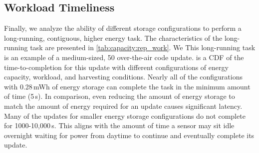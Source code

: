 \subsection{Workload Timeliness}
Finally, we analyze the ability of different storage configurations to perform a 
long-running, contiguous, higher energy task. 
The characteristics of the long-running task are presented in \cref{tab:capacity:rep_work}. We 
This long-running task is an example of a medium-sized, 50\ssi{\kilo\byte} over-the-air code update.
 is a CDF of the time-to-completion for this update with different configurations of energy capacity, workload, and harvesting conditions.
Nearly all of the configurations with
0.28\,mWh of energy storage can complete the task in the minimum amount of time (5\,s). In comparison,
even reducing the amount of energy storage to match the amount of energy
required for an update causes significant latency. 
Many of the updates for smaller energy storage configurations
do not complete for 1000-10,000\,s.
This aligns with the amount of time a sensor may sit
idle overnight waiting for power from daytime to continue and eventually complete its update.



